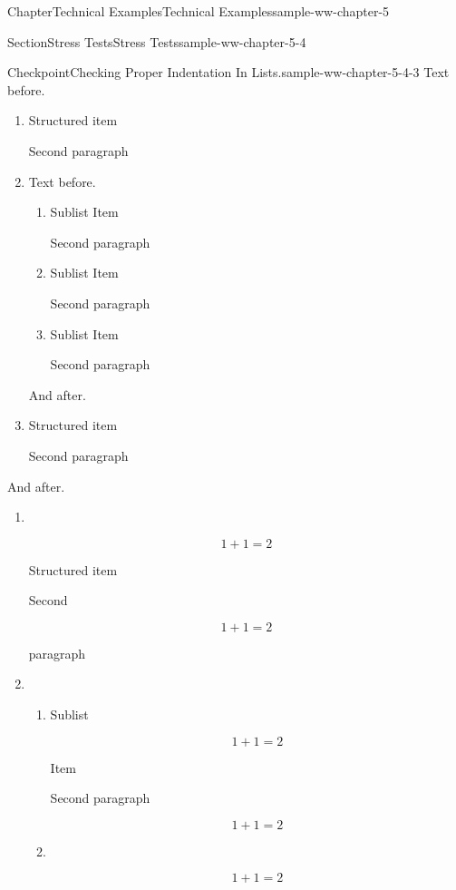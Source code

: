 \documentclass[oneside,10pt,]{book}
\numberwithin{equation}{section}
\begin{document}
\begin{chapterptx}{Chapter}{Technical Examples}{}{Technical Examples}{}{}{sample-ww-chapter-5}
\begin{sectionptx}{Section}{Stress Tests}{}{Stress Tests}{}{}{sample-ww-chapter-5-4}
\begin{inlineexercise}{Checkpoint}{Checking Proper Indentation In Lists.}{sample-ww-chapter-5-4-3}
Text before.%
\begin{enumerate}[label={\alph*.}]
\item{}Structured item%
\par
Second paragraph%
\item{}Text before.%
\begin{enumerate}[label={\arabic*.}]
\item{}Sublist Item%
\par
Second paragraph%
\item{}Sublist Item%
\par
Second paragraph%
\item{}Sublist Item%
\par
Second paragraph%
\end{enumerate}
%
\par
And after.%
\item{}Structured item%
\par
Second paragraph%
\end{enumerate}
%
\par
And after.%
\par
%
\begin{enumerate}[label={\alph*.}]
\item{}~%
\par
%
\begin{equation*}
1+1=2
\end{equation*}
%
\par
Structured item%
\par
Second%
\par
%
\begin{equation*}
1+1=2
\end{equation*}
%
\par
paragraph%
\item{}~%
\begin{enumerate}[label={\alph*.}]
\item{}Sublist%
\par
%
\begin{equation*}
1+1=2
\end{equation*}
%
\par
Item%
\par
Second paragraph%
\par
%
\begin{equation*}
1+1=2
\end{equation*}
%
\item{}~%
\par
%
\begin{equation*}
1+1=2
\end{equation*}

\end{enumerate}
\end{enumerate}
\end{inlineexercise}
\end{sectionptx}
\end{chapterptx}
\end{document}
